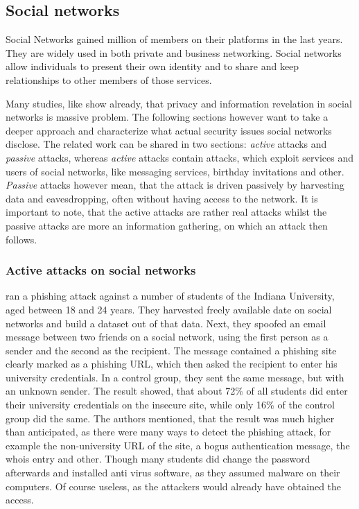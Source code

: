 \subsection{Social networks}

Social Networks gained million of members on their platforms in the last years.
They are widely used in both private and business networking. Social networks
allow individuals to present their own identity and to share and keep
relationships to other members of those services.

Many studies, like \cite{fraunhofer2008,gross2005} show already, that privacy
and information revelation in social networks is massive problem. The following
sections however want to take a deeper approach and characterize what actual
security issues social networks disclose. The related work can be shared in two
sections: \textit{active} attacks and \textit{passive} attacks, whereas
\textit{active} attacks contain attacks, which exploit
services and users of social networks, like messaging services, birthday
invitations and other. \textit{Passive} attacks however mean, that the attack is
driven passively by harvesting data and eavesdropping, often without having
access to the network.
It is important to note, that the active
attacks are rather real attacks whilst the passive attacks are more an
information gathering, on which an attack then follows.

\subsubsection{Active attacks on social networks}

\cite{jagatic2007} ran a phishing attack against a number of students of the
Indiana University, aged between 18 and 24 years. They harvested freely
available date on social networks and build a dataset out of that data. Next,
they spoofed an email message between two friends on a social network, using
the first person as a sender and the second as the recipient. The message
contained a phishing site clearly marked as a phishing URL, which then asked
the recipient to enter his university credentials. In a control group, they
sent the same message, but with an unknown sender. The result showed, that
about 72\% of all students did enter their university credentials on the
insecure site, while only 16\% of the control group did the same. The authors
mentioned, that the result was much higher than anticipated, as there were many
ways to detect the phishing attack, for example the non-university URL of the
site, a bogus authentication message, the whois entry and other. Though many
students did change the password afterwards and installed anti virus software,
as they assumed malware on their computers. Of course useless,
as the attackers would already have obtained the access.


